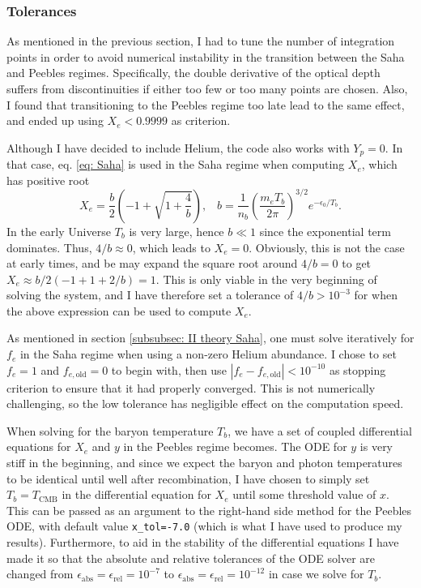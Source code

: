 \documentclass{aa}
\numberwithin{equation}{section}
\numberwithin{table}{section}
\numberwithin{figure}{section}
\begin{document}
\subsubsection{Tolerances}
As mentioned in the previous section, I had to tune the number of integration points in order to avoid numerical instability in the transition between the Saha and Peebles regimes. Specifically, the double derivative of the optical depth suffers from discontinuities if either too few or too many points are chosen. Also, I found that transitioning to the Peebles regime too late lead to the same effect, and ended up using $X_e<0.9999$ as criterion. 

Although I have decided to include Helium, the code also works with $Y_p=0$. In that case, eq. \eqref{eq: Saha} is used in the Saha regime when computing $X_e$, which has positive root
\begin{equation}
  X_e = \frac{b}{2}\left(-1+\sqrt{1 + \frac{4}{b}}\right), \hspace{10pt} b = \frac{1}{n_b}\left( \frac{m_eT_b}{2\pi}\right)^{3/2}e^{-\epsilon_0/T_b}.
\end{equation}
In the early Universe $T_b$ is very large, hence $b\ll 1$ since the exponential term dominates. Thus, $4/b\approx0$, which leads to $X_e = 0$. Obviously, this is not the case at early times, and be may expand the square root around $4/b = 0$ to get $X_e \approx b/2(-1 + 1 + 2/b)=1$. This is only viable in the very beginning of solving the system, and I have therefore set a tolerance of $4/b>10^{-3}$ for when the above expression can be used to compute $X_e$.

As mentioned in section \ref{subsubsec: II theory Saha}, one must solve iteratively for $f_e$ in the Saha regime when using a non-zero Helium abundance. I chose to set $f_e = 1$ and $f_{e,\text{old}}=0$ to begin with, then use $\left|f_e-f_{e,\text{old}}\right|<10^{-10}$ as stopping criterion to ensure that it had properly converged. This is not numerically challenging, so the low tolerance has negligible effect on the computation speed.

When solving for the baryon temperature $T_b$, we have a set of coupled differential equations for $X_e$ and $y$ in the Peebles regime becomes. The ODE for $y$ is very stiff in the beginning, and since we expect the baryon and photon temperatures to be identical until well after recombination, I have chosen to simply set $T_b=T_\text{CMB}$ in the differential equation for $X_e$ until some threshold value of $x$. This can be passed as an argument to the right-hand side method for the Peebles ODE, with default value \verb|x_tol=-7.0| (which is what I have used to produce my results). Furthermore, to aid in the stability of the differential equations I have made it so that the absolute and relative tolerances of the ODE solver are changed from $\epsilon_\text{abs}=\epsilon_\text{rel}=10^{-7}$ to $\epsilon_\text{abs}=\epsilon_\text{rel}=10^{-12}$ in case we solve for $T_b$. 
\end{document}
